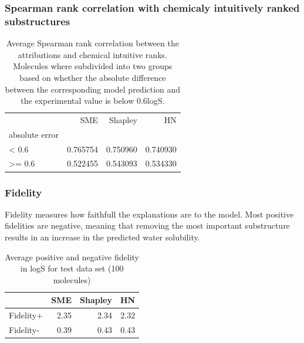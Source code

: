 \documentclass[twoside,twocolumn,9pt]{article}
\begin{document}
\subsubsection{Spearman rank correlation with chemicaly intuitively ranked substructures}

\begin{center}
\begin{table}[H]
    \caption{Average Spearman rank correlation between the attributions and chemical intuitive ranks. Molecules where 
        subdivided into two groups based on whether the absolute difference between the corresponding model prediction 
        and the experimental value is below $0.6$logS.
    }
\begin{tabular}{lrrr}
\toprule
 & SME  & Shapley  & HN  \\
absolute error &  &  &  \\
\midrule
< 0.6 & 0.765754 & 0.750960 & 0.740930 \\
>= 0.6 & 0.522455 & 0.543093 & 0.534330 \\
 \bottomrule
\end{tabular}
\end{table}
\end{center}




\subsubsection{Fidelity}

Fidelity measures how faithfull the explanations are to the model. 
Most positive fidelities are negative, meaning that removing the most important 
substructure results in an increase in the predicted water solubility.

\begin{center}
    \begin{table}[H]
        \caption{Average positive and negative fidelity in logS for test data set (100 molecules)}
\begin{tabular}{lrrr}
\toprule
 & SME & Shapley  & HN \\
\midrule
Fidelity+ & 2.35 & 2.34 & 2.32 \\
Fidelity- & 0.39 & 0.43 & 0.43 \\
 \bottomrule
\end{tabular}
\end{table}
\end{center}
\end{document}
